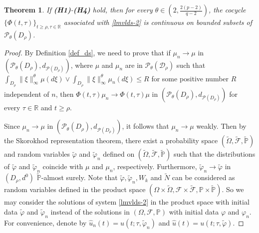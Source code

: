 \documentclass[11pt]{article}
\numberwithin{equation}{section}
\theoremstyle{plain}
\newtheorem{theorem}{Theorem}[section]
\begin{document}
\begin{theorem}\label{consys}
 If {\bf(H1)}-{\bf(H4)} hold,
then for  every 
   $ \theta \in \left(2, \tfrac{2(p-2)}{q-2} \right) $,
    the cocycle $\{ \Phi(t,\tau) \}_{t \ge { \rho}, \tau \in \mathbb{R}}$ associated with \eqref{lmvlds-2}
   is continuous on bounded subsets of $\mathcal{P}_{\theta}(D_{\rho})$.
\end{theorem}

\begin{proof}
 By Definition \ref{def_ds},
 we need to 
  prove that if $ \mu_n \to \mu $ in $
  \left( \mathcal{P}_{\theta}(D_{\rho}), d_{\mathcal{P}(D_{\rho})} \right)$,
 where $\mu$ and $\mu_n $ are 
 in
  $  \mathcal{P_{\theta}(D_{\rho})}$
 such that
   $\int_{D_{\rho}}
       \|\xi\|_{
       \infty }^{\theta} \mu(d\xi) \vee \int_{D_{\rho}} \|\xi\|_{\infty }^{\theta} \mu_n(d \xi)
       \le R$  for some
       positive number  $R  $ independent of $n$,
 then  
 $\Phi(t,\tau)\mu_n \to \Phi(t,\tau)\mu 
 $ in 
$ \left( \mathcal{P}_{\theta}(D_{\rho}), d_{\mathcal{P}(D_{\rho})} \right)$
for every $ \tau \in \mathbb{R} $ and $ t \ge \rho$.

 Since $ \mu_n \to \mu $ in
 $\left(\mathcal{P}_{\theta}(D_{\rho}), d_{\mathcal{P}(D_{\rho})} \right)$,
 it follows that $ \mu_n \to \mu $ weakly.
 Then by the Skorokhod representation theorem,
 there exist a probability space
   $(\widetilde{\Omega}, \widetilde{\mathcal{F}}, \widetilde{\mathbb{P}})$
 and random variables $\widetilde{\varphi}$ and $\widetilde{\varphi}_n$ defined on
 $(\widetilde{\Omega}, \widetilde{\mathcal{F}}, \widetilde{\mathbb{P}})$ such that the distributions of
 $\widetilde{\varphi}$ and $\widetilde{\varphi}_n$ coincide with
 $\mu$ and $\mu_n$, respectively.
 Furthermore,
   $  \widetilde{\varphi}_n 
   \to  \widetilde{\varphi}$
   in $ ({D_\rho}, d^0)$ 
   $\widetilde{\mathbb{P}}$-almost surely.
 Note that $\widetilde{\varphi}, \widetilde{\varphi}_n, W_k$
 and $\widetilde{N}$ can be considered as random variables defined in the product space
 $(\Omega \times \widetilde{\Omega},
   \mathcal{F} \times \widetilde{\mathcal{F}},
   \mathbb{P} \times \widetilde{\mathbb{P}} )
 $.
 So we may consider the solutions of system \eqref{lmvlds-2} in the product space
 with initial data $\widetilde{\varphi}$ and $\widetilde{\varphi}_n$ instead of the solutions in $(\Omega, \mathcal{F}, \mathbb{P})$
 with initial data $\varphi$ and $\varphi_n$.
 For convenience, denote by
     $\hat{u}_{n}(t) = u(t;\tau, \widetilde{\varphi}_n)$
 and $\hat{u}(t) = u(t; \tau, \widetilde{\varphi})$.


\end{proof}
\end{document}
